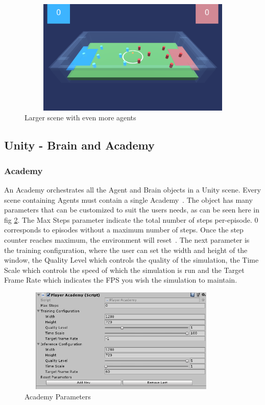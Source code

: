 \begin{figure}[H]
    \centering
    \includegraphics[width=115mm, height=55mm]{img/GameScreen2.png}
    \caption{Larger scene with even more agents}
    \label{fig:soc2}
\end{figure}

\subsection{Unity - Brain and Academy}
\subsubsection{Academy}
An Academy orchestrates all the Agent and Brain objects in a Unity scene. Every scene containing Agents must contain a single Academy~\cite{mlagentAcademy}. The object has many parameters that can be customized to suit the users needs, as can be seen here in fig \ref{fig:academy}. The Max Steps parameter indicate the total number of steps per-episode. 0 corresponds to episodes without a maximum number of steps. Once the step counter reaches maximum, the environment will reset~\cite{mlagentAcademy}. The next parameter is the training configuration, where the user can set the width and height of the window, the Quality Level which controls the quality of the simulation, the Time Scale which controls the speed of which the simulation is run and the Target Frame Rate which indicates the FPS you wish the simulation to maintain.

\begin{figure}[H]
    \centering
    \includegraphics[width=100mm, height=50mm]{img/Academy.PNG}
    \caption{Academy Parameters}
    \label{fig:academy}
\end{figure}

